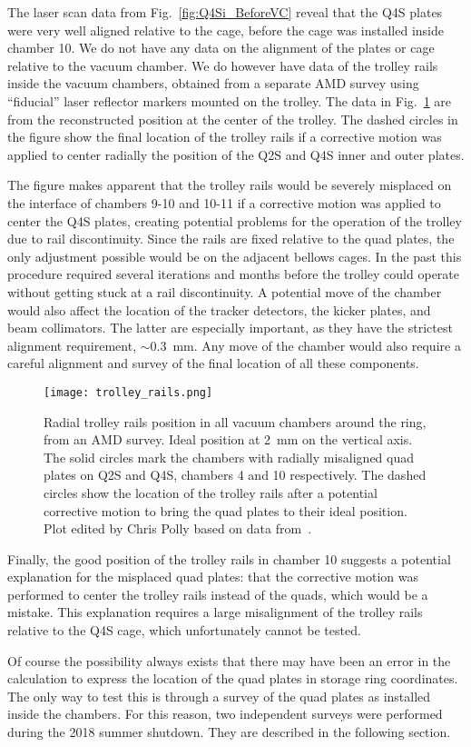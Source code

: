 The laser scan data from Fig.~\ref{fig:Q4Si_BeforeVC} reveal that the Q4S plates were very well aligned relative to the cage, before the cage was installed inside chamber 10. 
We do not have any data on the alignment of the plates or cage relative to the vacuum chamber.
We do however have data of the trolley rails inside the vacuum chambers, obtained from a separate AMD survey using ``fiducial'' laser reflector markers mounted on the trolley. The data in Fig.~\ref{fig:trolley_rails} are from the reconstructed position at the center of the trolley. 
The dashed circles in the figure show the final location of the trolley rails if a corrective motion was applied to center radially the position of the Q2S and Q4S inner and outer plates. 

The figure makes apparent that the trolley rails would be severely misplaced on the interface of chambers 9-10 and 10-11 if a corrective motion was applied to center the Q4S plates, creating potential problems for the operation of the trolley due to rail discontinuity. 
Since the rails are fixed relative to the quad plates, the only adjustment possible would be on the adjacent bellows cages. In the past this procedure required several iterations and months before the trolley could operate without getting stuck at a rail discontinuity.
A potential move of the chamber would also affect the location of the tracker detectors, the kicker plates, and beam collimators. The latter are especially important, as they have the strictest alignment requirement, $\sim$\SI{0.3}{mm}. Any move of the chamber would also require a careful alignment and survey of the final location of all these components.


\begin{figure}[]
	\centering
	\texttt{[image: trolley\_rails.png]}
	\caption{Radial trolley rails position in all vacuum chambers around the ring, from an AMD survey. Ideal position at \SI{2}{mm} on the vertical axis. The solid circles mark the chambers with radially misaligned quad plates on Q2S and Q4S, chambers 4 and 10 respectively. The dashed circles show the location of the trolley rails after a potential corrective motion to bring the quad plates to their ideal position. Plot edited by Chris Polly based on data from~\cite{Grange:elog386}.
	}\label{fig:trolley_rails}
\end{figure}


Finally, the good position of the trolley rails in chamber 10 suggests a potential explanation for the misplaced quad plates: that the corrective motion was performed to center the trolley rails instead of the quads, which would be a mistake. 
This explanation requires a large misalignment of the trolley rails relative to the Q4S cage, which unfortunately cannot be tested.

Of course the possibility always exists that there may have been an error in the calculation to express the location of the quad plates in storage ring coordinates.
The only way to test this is through a survey of the quad plates as installed inside the chambers. 
For this reason, two independent surveys were performed during the 2018 summer shutdown. They are described in the following section.




